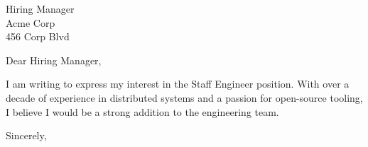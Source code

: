 \documentclass[11pt,a4paper]{letter}
\begin{document}
\begin{letter}{Hiring Manager \\ Acme Corp \\ 456 Corp Blvd}

\opening{Dear Hiring Manager,}

I am writing to express my interest in the Staff Engineer position.
With over a decade of experience in distributed systems and a passion
for open-source tooling, I believe I would be a strong addition to
the engineering team.

\closing{Sincerely,}
\end{letter}
\end{document}
